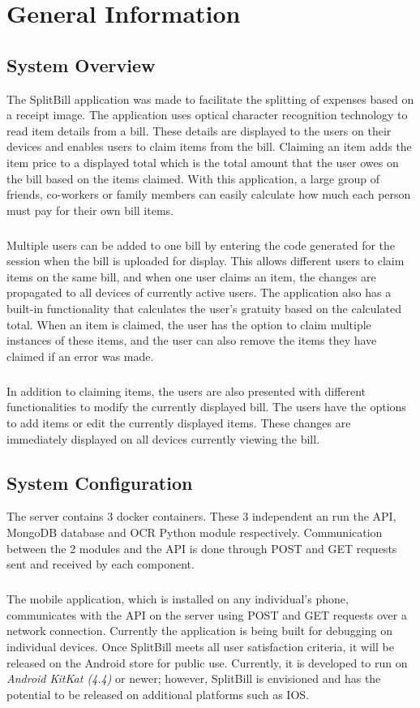 \documentclass[12pt,a4paper]{article}
\begin{document}
\section{General Information}
	\subsection{System Overview}
   The SplitBill application was made to facilitate the splitting of expenses based on a receipt image. The application uses optical character recognition technology to read item details from a bill. These details are displayed to the users on their devices and enables users to claim items from the bill. Claiming an item adds the item price to a displayed total which is the total amount that the user owes on the bill based on the items claimed. With this application, a large group of friends, co-workers or family members can easily calculate how much each person must pay for their own bill items.  
   \subparagraph{}
   Multiple users can be added to one bill by entering the code generated for the session when the bill is uploaded for display. This allows different users to claim items on the same bill, and when one user claims an item, the changes are propagated to all devices of currently active users. The application also has a built-in functionality that calculates the user's gratuity based on the calculated total. When an item is claimed, the user has the option to claim multiple instances of these items, and the user can also remove the items they have claimed if an error was made. 
   \subparagraph{}
   In addition to claiming items, the users are also presented with different functionalities to modify the currently displayed bill. The users have the options to add items or edit the currently displayed items. These changes are immediately displayed on all devices currently viewing the bill. 
    \subsection{System Configuration}
    
   The server contains 3 docker containers. These 3 independent an run the API, MongoDB database and OCR Python module respectively. Communication between the 2 modules and the API is done through POST and GET requests sent and received by each component.
   
   \subparagraph{} The mobile application, which is installed on any individual’s phone, communicates with the API on the server using POST and GET requests over a network connection. Currently the application is being built for debugging on individual devices. Once SplitBill meets all user satisfaction criteria, it will be released on the Android store for public use. Currently, it is developed to run on \emph{Android KitKat (4.4)} or newer; however, SplitBill is envisioned and has the potential to be released on additional platforms such as IOS. 
 
\end{document}
